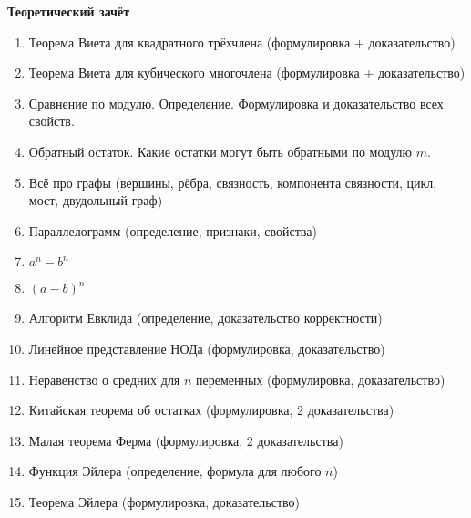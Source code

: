 \documentclass{article}
\begin{document}
\large

\begin{center}
	\textbf{Теоретический зачёт}
\end{center}

\begin{enumerate}[label*=\protect\fbox{\arabic{enumi}}]

\item Теорема Виета для квадратного трёхчлена (формулировка + доказательство)

\item Теорема Виета для кубического многочлена (формулировка + доказательство)

\item Сравнение по модулю. Определение. Формулировка и доказательство всех свойств.

\item Обратный остаток. Какие остатки могут быть обратными по модулю $m$.

\item Всё про графы (вершины, рёбра, связность, компонента связности, цикл, мост, двудольный граф)

\item Параллелограмм (определение, признаки, свойства)

\item $a^n - b^n$

\item $(a-b)^n$

\item Алгоритм Евклида (определение, доказательство корректности)

\item Линейное представление НОДа (формулировка, доказательство)

\item Неравенство о средних для $n$ переменных (формулировка, доказательство)

\item Китайская теорема об остатках (формулировка, 2 доказательства)

\item Малая теорема Ферма (формулировка, 2 доказательства)

\item Функция Эйлера (определение, формула для любого $n$)

\item Теорема Эйлера (формулировка, доказательство)

\end{enumerate}
\end{document}
